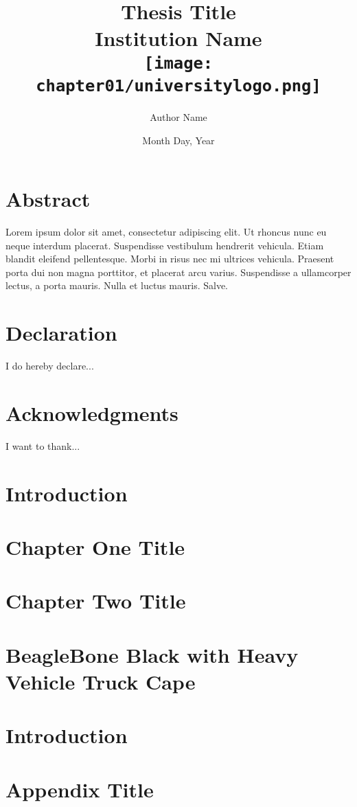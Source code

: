 





\title{
	{Thesis Title}\\
	{\large Institution Name}\\
	{\texttt{[image: chapter01/universitylogo.png]}}
}

\author{Author Name}
\date{Month Day, Year}



\maketitle
\chapter*{Abstract}
Lorem ipsum dolor sit amet, consectetur adipiscing elit. Ut rhoncus nunc eu neque interdum placerat. Suspendisse vestibulum hendrerit vehicula. Etiam blandit eleifend pellentesque. Morbi in risus nec mi ultrices vehicula. Praesent porta dui non magna porttitor, et placerat arcu varius. Suspendisse a ullamcorper lectus, a porta mauris. Nulla et luctus mauris. Salve.

\chapter*{Declaration}
I do hereby declare...

\chapter*{Acknowledgments}
I want to thank...

\tableofcontents

\chapter{Introduction}


\chapter{Chapter One Title}


\chapter{Chapter Two Title}


\chapter{BeagleBone Black with Heavy Vehicle Truck Cape}


\chapter{Introduction}


\appendix
\chapter{Appendix Title}


